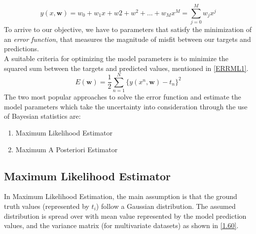 \documentclass[12pt,twoside,a4paper]{article}
\begin{document}
\begin{equation}\label{POLY}
    y(x, \textbf{w}) = w_0 + w_1x + w2+w^2 + ... + w_Mx^M = \sum_{j=0}^{M}w_jx^j
\end{equation}
To arrive to our objective, we have to parameters that satisfy the minimization of an \textit{error function}, that measures the magnitude of misfit between our targets and predictions. \\ 
A suitable criteria for optimizing the model parameters is to minimize the squared sum between the targets and predicted values, mentioned in \ref{ERRML1}.
\begin{equation}\label{ERRML1}
    E(\textbf{w}) = \frac{1}{2}\sum_{n=1}^{N}\{y(x^n, \textbf{w})-t_n\}^2
\end{equation}
The two most popular approaches to solve the error function and estimate the model parameters which take the uncertainty into consideration through the use of Bayesian statistics are:
\begin{enumerate}
    \item Maximum Likelihood Estimator
    \item Maximum A Posteriori Estimator
\end{enumerate}
\subsection{Maximum Likelihood Estimator}
In Maximum Likelihood Estimation, the main assumption is that the ground truth values (represented by $t_i$) follow a Gaussian distribution. The assumed distribution is spread over with mean value represented by the model prediction values, and the variance matrix (for multivariate datasets) as shown in \eqref{1.60}.
\end{document}
